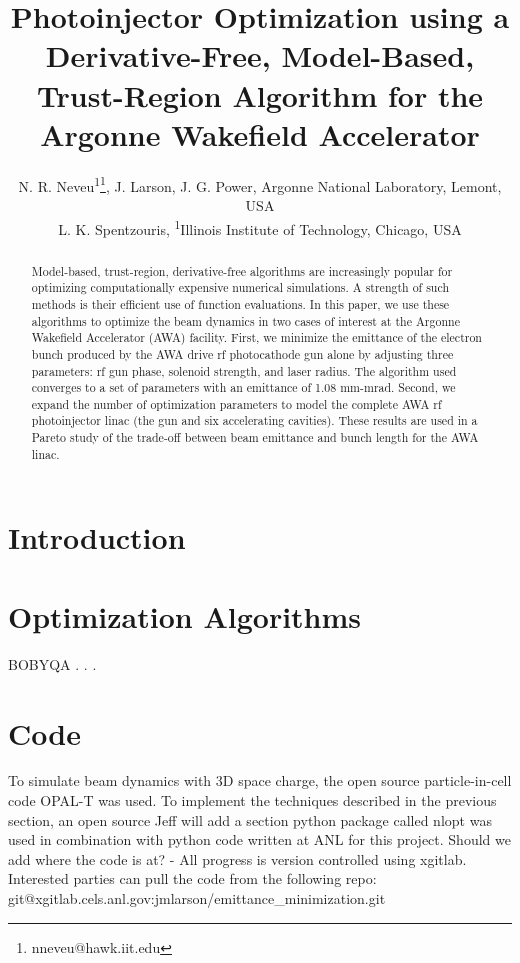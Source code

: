 \documentclass[letterpaper,  %
              ]{jacow}
\newcommand{\lsnote}[1]{\textsf{{\color{violet}{ LS note:}   #1 }}}
\newcommand{\nnnote}[1]{\textsf{{\color{blue}{ NN note:}   #1 }}}
\begin{document}
\title{Photoinjector Optimization using a Derivative-Free, Model-Based, 
	Trust-Region Algorithm for the Argonne Wakefield Accelerator } 
	

\author{N. R. Neveu\textsuperscript{1}\thanks{nneveu@hawk.iit.edu}, J. Larson, J. G. Power, Argonne National Laboratory, Lemont, USA \\
		L. K. Spentzouris, \textsuperscript{1}Illinois Institute of Technology, Chicago, USA}
	
\maketitle

%
\begin{abstract}
Model-based, trust-region, derivative-free algorithms 
are increasingly popular for optimizing computationally 
expensive numerical simulations. A strength of such
methods is their efficient use of function evaluations. 
In this paper, we use these algorithms to optimize 
the beam dynamics in two cases of interest at the 
Argonne Wakefield Accelerator (AWA) facility. 
First, we minimize the emittance of the electron 
bunch produced by the AWA drive rf photocathode gun 
alone by adjusting three parameters: rf gun phase, 
solenoid strength, and laser radius. The algorithm 
used converges to a set of parameters with an
emittance of 1.08 mm-mrad. Second, we expand 
the number of optimization parameters to model 
the complete AWA rf photoinjector linac 
(the gun and six accelerating cavities). 
These results are used in a Pareto study of the 
trade-off between beam emittance and bunch 
length for the AWA linac.
\end{abstract}


\section{Introduction}


\section{Optimization Algorithms}
BOBYQA \cite{bobyqa}. . .


\section{Code}
To simulate beam dynamics with 3D space charge, 
the open source particle-in-cell code OPAL-T 
\cite{opal} was used. To implement the techniques 
described in the previous section, an open source 
\lsnote {Jeff will add a section }
python package called nlopt \cite{nlopt} was used
in combination with python code written at ANL for this project.
\nnnote{Should we add where the code is at? -  
	All progress is version controlled using xgitlab.
Interested parties can pull the code from the following repo: 
git@xgitlab.cels.anl.gov:jmlarson/emittance\_minimization.git}
\end{document}
